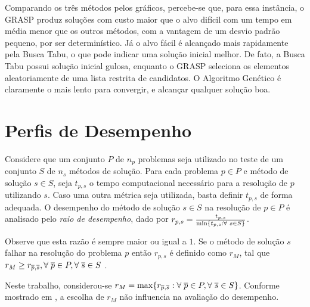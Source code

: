 \documentclass{MO824}
\begin{document}
Comparando os três métodos pelos gráficos, percebe-se que, para essa instância, o GRASP produz soluções com custo maior que o alvo difícil com um tempo em média menor que os outros métodos, com a vantagem de um desvio padrão pequeno, por ser determinístico. Já o alvo fácil é alcançado mais rapidamente pela Busca Tabu, o que pode indicar uma solução inicial melhor. De fato, a Busca Tabu possui solução inicial gulosa, enquanto o GRASP seleciona os elementos aleatoriamente de uma lista restrita de candidatos. O Algoritmo Genético é claramente o mais lento para convergir, e alcançar qualquer solução boa.

\section{Perfis de Desempenho}

Considere que um conjunto $P$ de $n_{p}$ problemas seja utilizado no teste de um conjunto $S$ de $n_{s}$ métodos de solução. Para cada problema $p \in P$ e método de solução $s \in S$, seja $t_{p, s}$ o tempo computacional necessário para a resolução de $p$ utilizando $s$. Caso uma outra métrica seja utilizada, basta definir $t_{p,s}$ de forma adequada. O desempenho do método de solução $s \in S$ na resolução de $p \in P$ é analisado pelo \textit{raio de desempenho}, dado por $ r_{p, s} = \frac{t_{p,s}}{\min\{t_{p, s} : \forall \hspace{0.10cm} s \in S\}} $.

Observe que esta razão é sempre maior ou igual a $1$. Se o método de solução $s$ falhar na resolução do problema $p$ então $r_{p,s}$ é definido como $r_{M}$, tal que $ r_{M} \ge r_{\overline{p}, \overline{s}}, \forall \hspace{0.10cm} \overline{p} \in P, \forall \hspace{0.10cm} \overline{s} \in S$ .

Neste trabalho, considerou-se $r_{M} = \max\{r_{\overline{p}, \overline{s}} : \forall \hspace{0.10cm} \overline{p} \in P, \forall \hspace{0.10cm} \overline{s} \in S\}$. Conforme mostrado em \cite{pp}, a escolha de $r_{M}$ não influencia na avaliação do desempenho.
\end{document}
